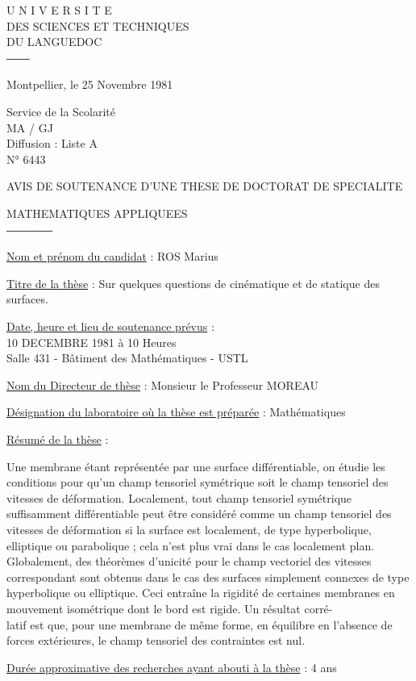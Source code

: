U N I V E R S I T E\\
DES SCIENCES ET TECHNIQUES\\
DU LANGUEDOC\\
\texttt{------------}

Montpellier, le 25 Novembre 1981

Service de la Scolarité\\
MA / GJ\\
Diffusion : Liste A\\
N° 6443

AVIS DE SOUTENANCE D'UNE THESE DE DOCTORAT DE SPECIALITE

MATHEMATIQUES APPLIQUEES\\
\texttt{------------------------}

\uline{Nom et prénom du candidat} : ROS Marius

\uline{Titre de la thèse} : Sur quelques questions de cinématique et de statique des surfaces.

\uline{Date, heure et lieu de soutenance prévus} :\\
10 DECEMBRE 1981 à 10 Heures\\
Salle 431 - Bâtiment des Mathématiques - USTL

\uline{Nom du Directeur de thèse} : Monsieur le Professeur MOREAU

\uline{Désignation du laboratoire où la thèse est préparée} : Mathématiques

\uline{Résumé de la thèse} :

Une membrane étant représentée par une surface différentiable, on étudie les conditions pour qu'un champ tensoriel symétrique soit le champ tensoriel des vitesses de déformation. Localement, tout champ tensoriel symétrique suffisamment différentiable peut être considéré comme un champ tensoriel des vitesses de déformation si la surface est localement, de type hyperbolique, elliptique ou parabolique ; cela n'est plus vrai dans le cas localement plan. Globalement, des théorèmes d'unicité pour le champ vectoriel des vitesses correspondant sont obtenus dans le cas des surfaces simplement connexes de type hyperbolique ou elliptique. Ceci entraîne la rigidité de certaines membranes en mouvement isométrique dont le bord est rigide. Un résultat corré-\\
latif est que, pour une membrane de même forme, en équilibre en l'absence de forces extérieures, le champ tensoriel des contraintes est nul.

\uline{Durée approximative des recherches ayant abouti à la thèse} : 4 ans

